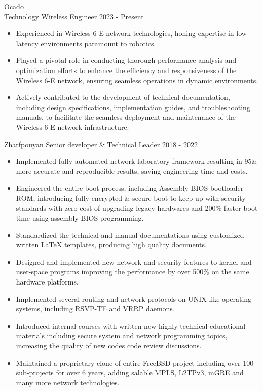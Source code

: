 \documentclass[12pt]{developercv}
\begin{document}
\begin{entrylist}
	\entry
		{Ocado\\Technology}
		{Wireless Engineer}
		{2023 - Present}
		{
  			\begin{itemize}
				\itemsep0em

				\item Experienced in Wireless 6-E network technologies, honing expertise in low-latency
				environments paramount to robotics.
				\item Played a pivotal role in conducting thorough performance analysis and optimization
				efforts to enhance the efficiency and responsiveness of the Wireless 6-E network, ensuring
				seamless operations in dynamic environments.
				\item Actively contributed to the development of technical documentation, including design
				specifications, implementation guides, and troubleshooting manuals, to facilitate the seamless
				deployment and maintenance of the Wireless 6-E network infrastructure.
			\end{itemize}
		}
	\entry
		{Zharfpouyan}
		{Senior developer \& Technical Leader}
		{2018 - 2022}
		{
			\begin{itemize}
				\itemsep0em
				\item Implemented fully automated network laboratory framework resulting in 95\&
				more accurate and reproducible results, saving engineering time and costs.
				\item Engineered the entire boot process, including Assembly BIOS bootloader ROM, introducing fully encrypted \& secure
				boot to keep-up with security standards with zero cost of upgrading legacy hardwares and
				200\% faster boot time using assembly BIOS programming.
				\item Standardized the technical and manual documentations using customized written \LaTeX
				templates, producing high quality documents.
				\item Designed and implemented new network and security features to kernel and user-space
				programs improving the performance by over 500\% on the same hardware platforms.
				\item Implemented several routing and network protocols on UNIX like operating systems,
				including RSVP-TE and VRRP daemons.
				\item Introduced internal courses with written new highly technical educational materials including
				secure system and network programming topics, increasing the quality of
				new codes code review discussions.
				\item Maintained a proprietary clone of entire FreeBSD project including over 100+ sub-projects
				for over 6 years, adding
				salable MPLS, L2TPv3, mGRE and many more network technologies.
			\end{itemize}

}
\end{entrylist}
\end{document}
